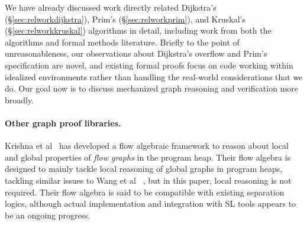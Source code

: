 We have already discussed work directly related Dijkstra's (\S\ref{sec:relworkdijkstra}), Prim's (\S\ref{sec:relworkprim}), and Kruskal's (\S\ref{sec:relworkkruskal}) algorithms in detail, including work from both the algorithms and formal methods literature.  Briefly to the point of unreasonableness, our observations about Dijkstra's overflow and Prim's specification are novel, and existing formal proofs focus on code working within idealized environments rather than handling the real-world considerations that we do.  Our goal now is to discuss mechanized graph reasoning and verification more broadly.


\paragraph{Other graph proof libraries.} Krishna et al~\cite{DBLP:conf/esop/KrishnaSW20} has developed a flow algebraic framework to reason about local and global properties of \textit{flow graphs} in the program heap. Their flow algebra is designed to mainly tackle local reasoning of global graphs in program heaps, tackling similar issues to Wang et al ~\cite{DBLP:journals/pacmpl/WangCMH19}, but in this paper, local reasoning is not required. Their flow algebra is said to be compatible with existing separation logics, although actual implementation and integration with SL tools appears to be an ongoing progress.




